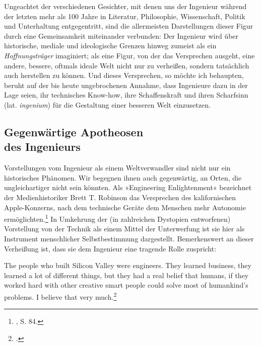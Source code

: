 \documentclass[%
	fontsize=10pt,%
	twoside,%
	headings=optiontoheadandtoc,%
	showtrims]{scrbook}
\renewenvironment{quote}{%
  \addmargin[\genericindent]{0pt}%
  \KOMAoptions{parskip=true}%
  \ifdim\parskip>0pt\else\addvspace{\intextsep}\fi
}{%
  \par
  \endaddmargin\vspace{\intextsep}
}
\begin{document}
Ungeachtet der verschiedenen Gesichter, mit denen uns der Ingenieur während der letzten mehr als 100 Jahre in Literatur, Philosophie, Wissenschaft, Politik und Unterhaltung entgegentritt, sind die allermeisten Darstellungen dieser Figur durch eine Gemeinsamkeit miteinander verbunden: Der Ingenieur wird über historische, mediale und ideologische Grenzen hinweg zumeist als ein \emph{Hoffnungsträger} imaginiert; als eine Figur, von der das Versprechen ausgeht, eine andere, bessere, oftmals ideale Welt nicht nur zu verheißen, sondern tatsächlich auch herstellen zu können. Und dieses Versprechen, so möchte ich behaupten, beruht auf der bis heute ungebrochenen Annahme, dass Ingenieure dazu in der Lage seien, ihr technisches Know-how, ihre Schaffenskraft und ihren Scharfsinn (lat. \emph{ingenium}) für die Gestaltung einer besseren Welt einzusetzen.
\subsection[Gegenwärtige Apotheosen    des Ingenieurs]{Gegenwärtige Apotheosen \- \protect\\ des Ingenieurs}
\par Vorstellungen vom Ingenieur als einem Weltverwandler sind nicht nur ein historisches Phänomen. Wir begegnen ihnen auch gegenwärtig, an Orten, die ungleichartiger nicht sein könnten. Als »Engineering Enlightenment« bezeichnet der Medien\-his\-to\-ri\-ker Brett T. Robinson das Versprechen des kalifornischen Ap\-ple-Kon\-zerns, nach dem technische Geräte dem Menschen mehr Autonomie ermöglichten.\footnote{\cite[][]{robinson2013a}, S. 84.}  In Umkehrung der (in zahlrei\-chen Dystopien entworfenen) Vorstellung von der Technik als einem Mittel der Unterwerfung ist sie hier als Instrument menschlicher Selbstbestimmung dargestellt. Bemerkenswert an dieser Verheißung ist, dass sie dem Ingenieur eine tragende Rolle zuspricht:\begin{quote}
\par The people who built Silicon Valley were engineers. They learned business, they learned a lot of different things, but they had a real belief that humans, if they worked hard with other creative smart people could solve most of humankind\textquoteright{}s problems. I believe that very much.\footnote{\cite[][]{jobs1996a}.} 
\end{quote}
\end{document}
